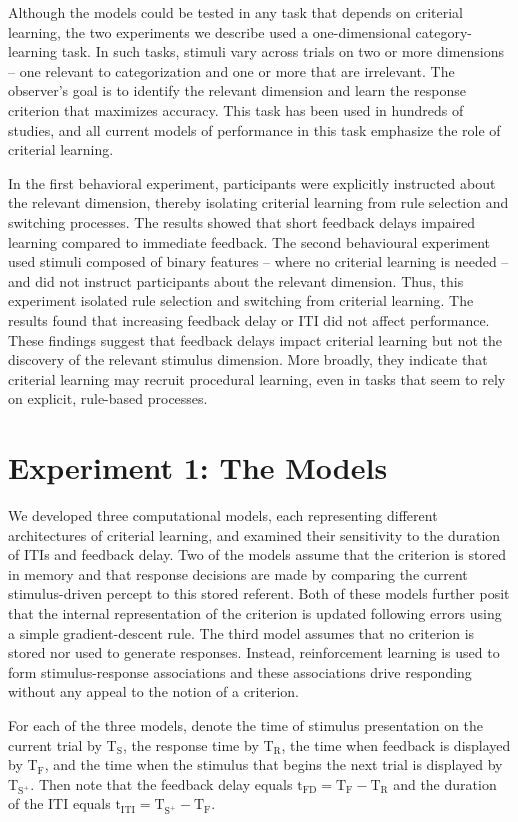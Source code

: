 \documentclass[doc, floatsintext]{apa7}
\begin{document}
Although the models could be tested in any task that depends
on criterial learning, the two experiments we describe used
a one-dimensional category-learning task. In such tasks,
stimuli vary across trials on two or more dimensions -- one
relevant to categorization and one or more that are
irrelevant. The observer's goal is to identify the relevant
dimension and learn the response criterion that maximizes
accuracy. This task has been used in hundreds of studies,
and all current models of performance in this task emphasize
the role of criterial learning.

In the first behavioral experiment, participants were
explicitly instructed about the relevant dimension, thereby
isolating criterial learning from rule selection and
switching processes. The results showed that short feedback
delays impaired learning compared to immediate feedback.
The second behavioural experiment used stimuli composed of
binary features -- where no criterial learning is needed --
and did not instruct participants about the relevant
dimension. Thus, this experiment isolated rule selection and
switching from criterial learning. The results found that
increasing feedback delay or ITI did not affect performance.
These findings suggest that feedback delays impact criterial
learning but not the discovery of the relevant stimulus
dimension.  More broadly, they indicate that criterial
learning may recruit procedural learning, even in tasks that
seem to rely on explicit, rule-based processes.

\section{Experiment 1: The Models}
We developed three computational models, each representing
different architectures of criterial learning, and examined
their sensitivity to the duration of ITIs and feedback
delay. Two of the models assume that the criterion is stored
in memory and that response decisions are made by comparing
the current stimulus-driven percept to this stored referent.
Both of these models further posit that the internal
representation of the criterion is updated following errors
using a simple gradient-descent rule. The third model
assumes that no criterion is stored nor used to generate
responses. Instead, reinforcement learning is used to form
stimulus-response associations and these associations drive
responding without any appeal to the notion of a criterion. 

For each of the three models, denote the time of stimulus
presentation on the current trial by T$_\text{S}$, the
response time by T$_\text{R}$, the time when feedback is
displayed by T$_\text{F}$, and the time when the stimulus
that begins the next trial is displayed by T$_{\text{S}^+}$.
Then note that the feedback delay equals
$\text{t}_\text{FD} = \text{T}_\text{F} - \text{T}_\text{R}$
and the duration of the ITI equals $\text{t}_\text{ITI} =
\text{T}_{\text{S}^+} - \text{T}_\text{F}$.
\end{document}
